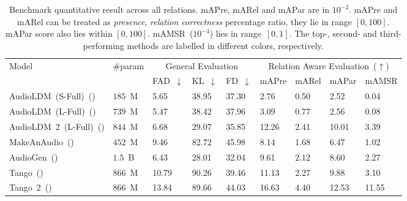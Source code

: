 \begin{table}[t]
\centering
\small
\caption{Benchmark quantitative result across all relations. mAPre, mARel and mAPar are in $10^{-2}$. mAPre and mARel can be treated as \textit{presence}, \textit{relation correctness} percentage ratio, they lie in range $[0, 100]$. mAPar score also lies within $[0, 100]$. mAMSR~($10^{-4}$) lies in range~$[0,1]$. The \colorbox{topcolor}{top-}, \colorbox{secondcolor}{second-} and \colorbox{thirdcolor}{third-} performing methods are labelled in different colors, respectively.}
\begin{tabular}{l|p{1.0cm}<{\centering}|p{0.7cm}<{\centering}p{0.7cm}<{\centering}p{0.7cm}<{\centering}|p{0.7cm}<{\centering}p{0.7cm}<{\centering}p{0.7cm}<{\centering}|p{0.9cm}<{\centering}}
\hline
\multirow{2}{*}{Model} & \multirow{2}{*}{\#param} & \multicolumn{3}{c|}{General Evaluation}  & \multicolumn{4}{c}{Relation Aware Evaluation~($\uparrow$)} \\
\cline{3-9}
 &   & FAD~$\downarrow$ &  KL~$\downarrow$ & FD~$\downarrow$ & mAPre& mARel & mAPar &mAMSR \\
\hline
AudioLDM~(S-Full)~(\citeyear{liu2023audioldm})  & $185$~M  & \cellcolor{secondcolor}5.65  & 38.95 & \cellcolor{thirdcolor}37.30 & 2.76 & 0.50 & 2.52 & 0.04\\
AudioLDM~(L-Full)~(\citeyear{liu2023audioldm})  & $739$~M  & \cellcolor{topcolor}5.47  & \cellcolor{thirdcolor}38.42 & 37.96 & 3.09 & 0.77 & 2.56 & 0.08\\
AudioLDM~2~(L-Full)~(\citeyear{audioldm2}) & $844$~M & 6.68 & \cellcolor{secondcolor}29.07 &  \cellcolor{secondcolor}35.85& \cellcolor{secondcolor}12.26& \cellcolor{secondcolor}2.41 & \cellcolor{secondcolor}10.01 & \cellcolor{secondcolor}3.39 \\
MakeAnAudio~(\citeyear{makeanaudio}) & $452$~M & 9.46 & 82.72  & 45.98 & 8.14  & 1.68 & 6.47 & 1.02\\
AudioGen~(\citeyear{kreuk2022audiogen}) & $1.5$~B & \cellcolor{thirdcolor}6.43 & \cellcolor{topcolor}28.01& \cellcolor{topcolor}32.04 & 9.61 & 2.12 & 8.60 & 2.27\\
Tango~(\citeyear{ghosal2023tango}) & $866$~M & 10.79 & 90.26 & 39.46 & \cellcolor{thirdcolor}11.13 & \cellcolor{thirdcolor}2.27 & \cellcolor{thirdcolor}9.88 & \cellcolor{thirdcolor}3.10\\
Tango~2~(\citeyear{ghosal2023tango2}) & $866$~M & 13.84  &  89.66 & 44.03 & \cellcolor{topcolor}16.63 & \cellcolor{topcolor}4.40 & \cellcolor{topcolor}12.53 & \cellcolor{topcolor}11.55 \\
\hline
\end{tabular}
\label{tab:general-results}
\end{table}

